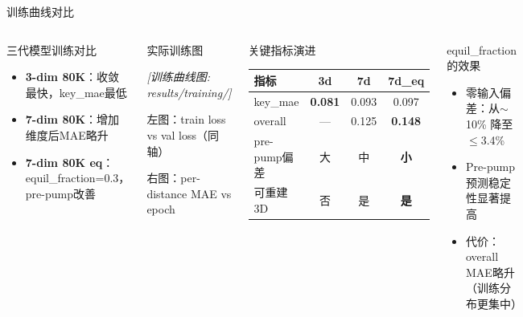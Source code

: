 \documentclass[aspectratio=169,9pt]{beamer}
\begin{document}
\begin{frame}{训练曲线对比}
  \begin{columns}[T]
    \begin{block}{三代模型训练对比}
      \scriptsize
      \begin{itemize}
        \item \textbf{3-dim 80K}：收敛最快，key\_mae最低
        \item \textbf{7-dim 80K}：增加维度后MAE略升
        \item \textbf{7-dim 80K eq}：equil\_fraction=0.3，pre-pump改善
      \end{itemize}
    \end{block}

    \begin{block}{实际训练图}
      \scriptsize
      \begin{center}
        \textit{[训练曲线图: results/training/]}

        左图：train loss vs val loss（同轴）

        右图：per-distance MAE vs epoch
      \end{center}
    \end{block}

    \begin{block}{关键指标演进}
      \scriptsize
      \renewcommand{\arraystretch}{1.1}
      \begin{tabular}{@{}lccc@{}}
        \toprule
        指标 & 3d & 7d & 7d\_eq \\
        \midrule
        key\_mae & \textbf{0.081} & 0.093 & 0.097 \\
        overall & --- & 0.125 & \textbf{0.148} \\
        pre-pump偏差 & 大 & 中 & \textbf{小} \\
        可重建3D & 否 & 是 & \textbf{是} \\
        \bottomrule
      \end{tabular}
    \end{block}

    \begin{exampleblock}{equil\_fraction的效果}
      \scriptsize
      \begin{itemize}
        \item 零输入偏差：从$\sim$10\% 降至 $\leq$3.4\%
        \item Pre-pump预测稳定性显著提高
        \item 代价：overall MAE略升（训练分布更集中）
      \end{itemize}
    \end{exampleblock}
  \end{columns}
\end{frame}
\end{document}
